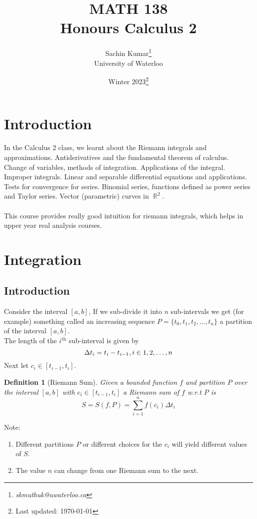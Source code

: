 \documentclass[10pt]{article}
\DeclareMathOperator{\R}{{\mathbb{R}}}
\theoremstyle{break}
\newtheorem{defn}{Definition}[subsection]
\newcommand{\subject}{MATH 138 \\ Honours Calculus 2}
\newcommand{\semester}{Winter 2023}
\begin{document}
\let\ref\Cref

\title{\subject}
\author{Sachin Kumar\thanks{\itshape skmuthuk@uwaterloo.ca}\\ University of Waterloo}
\date{\semester\thanks{Last updated: \today}}

\maketitle
\newpage
\tableofcontents
\setcounter{section}{-1}
\newpage

\section{Introduction}
In the Calculus 2 class, we learnt about the Riemann integrals and approximations. Antiderivatives and the fundamental theorem of calculus. Change of variables, methods of integration. 
Applications of the integral. Improper integrals. Linear and separable differential equations and applications. Tests for convergence for series. Binomial series, 
functions defined as power series and Taylor series. Vector (parametric) curves in $\R^2$. \\ \vspace{0.5ex} \\
This course provides really good intuition for riemann integrals, which helps in upper year real analysis courses. 

\newpage 

\section{Integration}

\subsection{Introduction}
Consider the interval $[a, b]$,
If we sub-divide it into $n$ sub-intervals we get (for example) something called an increasing sequence $P = \{t_0, t_1, t_2, \dots, t_n\}$ a partition of the interval $[a, b]$. \\
The length of the $i^{\text{th}}$ sub-interval is given by $$\Delta t_i = t_i - t_{i-1}, \space \space i \in 1, 2, \dots, n$$
Next let $c_i \in [t_{i-1}, t_i]$.

\begin{defn}[Riemann Sum]
    Given a bounded function $f$ and partition $P$ over the interval $[a, b]$ with $c_i \in [t_{i-1}, t_i]$ a Riemann sum of $f$ w.r.t  $P$ is $$S = S(f, P) = \sum^{n}_{i=1}f(c_i)\Delta t_i$$
\end{defn}
Note:
\begin{enumerate}
    \item Different partitions $P$ or different choices for the $c_i$ will yield different values of $S$.
    \item The value $n$ can change from one Riemann sum to the next.
\end{enumerate}
\end{document}
